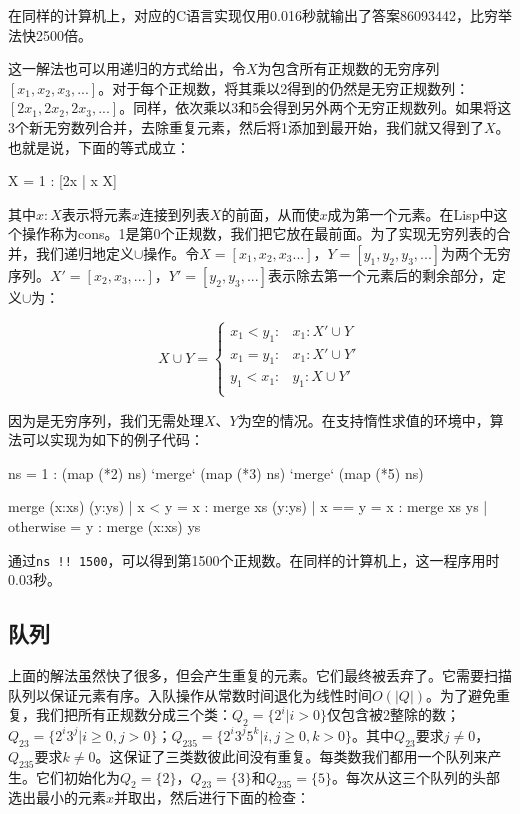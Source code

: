 \documentclass[b5paper]{ctexart}
\begin{document}
在同样的计算机上，对应的C语言实现仅用0.016秒就输出了答案86093442，比穷举法快2500倍。

这一解法也可以用递归的方式给出，令$X$为包含所有正规数的无穷序列$[x_1, x_2, x_3, ...]$。对于每个正规数，将其乘以2得到的仍然是无穷正规数列：$[2x_1, 2x_2, 2x_3, ...]$。同样，依次乘以3和5会得到另外两个无穷正规数列。如果将这3个新无穷数列合并，去除重复元素，然后将1添加到最开始，我们就又得到了$X$。也就是说，下面的等式成立：

\be
  X = 1 : [2x | \forall x \in X]\cup [3x | \forall x \in X] \cup [5x | \forall x \in X]
\ee

其中$x : X$表示将元素$x$连接到列表$X$的前面，从而使$x$成为第一个元素。在Lisp中这个操作称为cons。1是第0个正规数，我们把它放在最前面。为了实现无穷列表的合并，我们递归地定义$\cup$操作。令$X=[x_1, x_2, x_3...]$，$Y=[y_1, y_2, y_3, ...]$为两个无穷序列。$X' = [x_2, x_3, ...]$，$Y'=[y_2, y_3, ...]$表示除去第一个元素后的剩余部分，定义$\cup$为：

\[
X \cup Y = \begin{cases}
  x_1 < y_1: & x_1 : X' \cup Y \\
  x_1 = y_1: & x_1 : X' \cup Y' \\
  y_1 < x_1: & y_1 : X \cup Y' \\
\end{cases}
\]

因为是无穷序列，我们无需处理$X$、$Y$为空的情况。在支持惰性求值的环境中，算法可以实现为如下的例子代码：

\begin{Haskell}
ns = 1 : (map (*2) ns) `merge` (map (*3) ns) `merge` (map (*5) ns)

merge (x:xs) (y:ys) | x < y = x : merge xs (y:ys)
                    | x == y = x : merge xs ys
                    | otherwise = y : merge (x:xs) ys
\end{Haskell}

通过\texttt{ns !! 1500}，可以得到第1500个正规数。在同样的计算机上，这一程序用时0.03秒。

\subsection*{队列}
上面的解法虽然快了很多，但会产生重复的元素。它们最终被丢弃了。它需要扫描队列以保证元素有序。入队操作从常数时间退化为线性时间$O(|Q|)$。为了避免重复，我们把所有正规数分成三个类：$Q_2 = \{2^i | i > 0\}$仅包含被2整除的数；$Q_{23} = \{ 2^i3^j | i \geq 0, j > 0 \}$；$Q_{235} = \{ 2^i3^j5^k | i,j \geq 0, k > 0\}$。其中$Q_{23}$要求$j \neq 0$，$Q_{235}$要求$k \neq 0$。这保证了三类数彼此间没有重复。每类数我们都用一个队列来产生。它们初始化为$Q_2=\{ 2 \}$，$Q_{23} = \{ 3\}$和$Q_{235} = \{ 5 \}$。每次从这三个队列的头部选出最小的元素$x$并取出，然后进行下面的检查：
\end{document}
